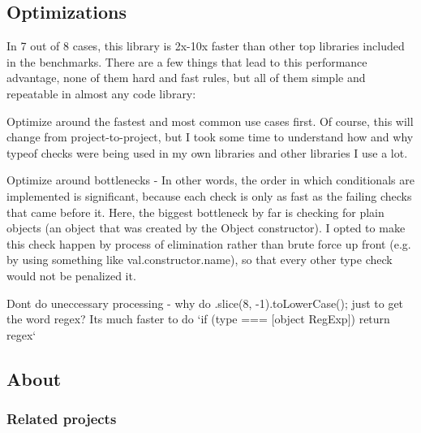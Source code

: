 \subsection*{Optimizations}

In 7 out of 8 cases, this library is 2x-\/10x faster than other top libraries included in the benchmarks. There are a few things that lead to this performance advantage, none of them hard and fast rules, but all of them simple and repeatable in almost any code library\+:


\begin{DoxyEnumerate}
\item Optimize around the fastest and most common use cases first. Of course, this will change from project-\/to-\/project, but I took some time to understand how and why {\ttfamily typeof} checks were being used in my own libraries and other libraries I use a lot.
\item Optimize around bottlenecks -\/ In other words, the order in which conditionals are implemented is significant, because each check is only as fast as the failing checks that came before it. Here, the biggest bottleneck by far is checking for plain objects (an object that was created by the {\ttfamily Object} constructor). I opted to make this check happen by process of elimination rather than brute force up front (e.\+g. by using something like {\ttfamily val.\+constructor.\+name}), so that every other type check would not be penalized it.
\item Don\textquotesingle{}t do uneccessary processing -\/ why do {\ttfamily .slice(8, -\/1).to\+Lower\+Case();} just to get the word {\ttfamily regex}? It\textquotesingle{}s much faster to do `if (type === \textquotesingle{}\mbox{[}object Reg\+Exp\mbox{]}\textquotesingle{}) return \textquotesingle{}regex\textquotesingle{}`
\end{DoxyEnumerate}

\subsection*{About}

\subsubsection*{Related projects}


